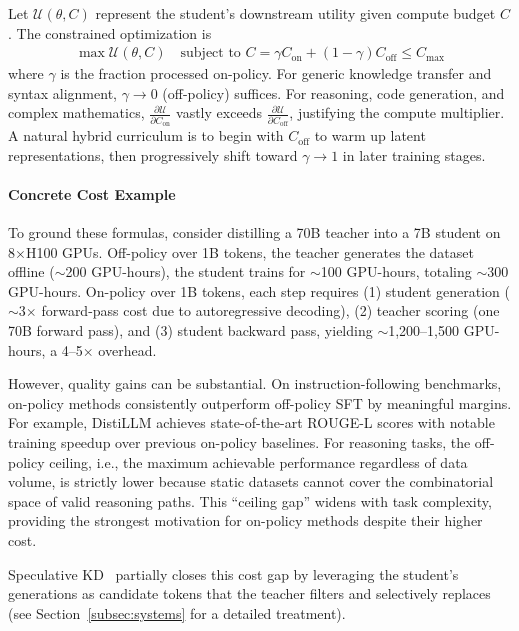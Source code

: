 \documentclass{article} %
\begin{document}
Let $\mathcal{U}(\theta, C)$ represent the student's downstream utility given compute budget $C$. The constrained optimization is
\begin{align}
\max \mathcal{U}(\theta, C) \quad \text{subject to } C = \gamma C_{\text{on}} + (1 - \gamma) C_{\text{off}} \le C_{\text{max}}
\end{align}
where $\gamma$ is the fraction processed on-policy. For generic knowledge transfer and syntax alignment, $\gamma \to 0$ (off-policy) suffices. For reasoning, code generation, and complex mathematics, $\frac{\partial \mathcal{U}}{\partial C_{\text{on}}}$ vastly exceeds $\frac{\partial \mathcal{U}}{\partial C_{\text{off}}}$, justifying the compute multiplier. A natural hybrid curriculum is to begin with $C_{\text{off}}$ to warm up latent representations, then progressively shift toward $\gamma \to 1$ in later training stages.

\paragraph{Concrete Cost Example}
To ground these formulas, consider distilling a 70B teacher into a 7B student on 8$\times$H100 GPUs. Off-policy over 1B tokens, the teacher generates the dataset offline ($\sim$200 GPU-hours), the student trains for $\sim$100 GPU-hours, totaling $\sim$300 GPU-hours. On-policy over 1B tokens, each step requires (1) student generation ($\sim$3$\times$ forward-pass cost due to autoregressive decoding), (2) teacher scoring (one 70B forward pass), and (3) student backward pass, yielding $\sim$1,200--1,500 GPU-hours, a 4--5$\times$ overhead.

However, quality gains can be substantial. On instruction-following benchmarks, on-policy methods consistently outperform off-policy SFT by meaningful margins. For example, DistiLLM \citep{2402.03898} achieves state-of-the-art ROUGE-L scores with notable training speedup over previous on-policy baselines. For reasoning tasks, the off-policy ceiling, i.e., the maximum achievable performance regardless of data volume, is strictly lower because static datasets cannot cover the combinatorial space of valid reasoning paths. This ``ceiling gap'' widens with task complexity, providing the strongest motivation for on-policy methods despite their higher cost.

Speculative KD~\citep{2410.11325} partially closes this cost gap by leveraging the student's generations as candidate tokens that the teacher filters and selectively replaces (see Section~\ref{subsec:systems} for a detailed treatment).
\end{document}
